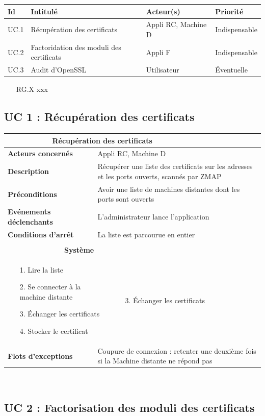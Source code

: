 \documentclass[a4paper,11pt,french]{article}
\newcommand{\fiche}[9] {
	\noindent
\begin{tabular}{|p{4cm}| p{2cm} | p{4cm} | p{.5cm} | p{7cm}|} 
\hline
\rowcolor{blue}
\multicolumn{2}{|l|}{\color{white}\bfseries{Nom}} & \multicolumn{3}{l|}{\color{white}\bfseries{#1}}\\
\hline
\multicolumn{2}{|l|}{\bfseries{Acteurs concernés}} & \multicolumn{3}{m{10.5cm}|}{#2}\\
\hline
\multicolumn{2}{|l|}{\bfseries{Description}} & \multicolumn{3}{m{10.5cm}|}{#3}\\
\hline
\multicolumn{2}{|l|}{\bfseries{Préconditions}} & \multicolumn{3}{m{10.5cm}|}{#4}\\
\hline
\multicolumn{2}{|l|}{\bfseries{Evénements déclenchants}} & \multicolumn{3}{m{10.5cm}|}{#5}\\
\hline
\multicolumn{2}{|l|}{\bfseries{Conditions d'arrêt}} & \multicolumn{3}{m{10.5cm}|}{#6}\\
\hline
\rowcolor{gray}
\multicolumn{5}{|c|}{\bfseries{Description du flot d'événements principal}}\\
\hline
\rowcolor{gray}
\multicolumn{3}{|c|}{\bfseries{Acteur(s)}} & \multicolumn{2}{c|}{\bfseries{Système}}\\
\hline
\multicolumn{3}{|p{7.5cm}|}{#7} & \multicolumn{2}{p{7.5cm}|}{#8}\\
\hline
\multicolumn{2}{|l}{\bfseries{Flots d'exceptions}} & \multicolumn{3}{|p{11.5cm}|}{#9}\\
\hline
\end{tabular}
\\
}
\begin{document}
\begin{center}
\begin{tabular}{|l|p{6cm}|p{6cm}|l|}
\hline
\bfseries{Id} & \bfseries{Intitulé} & \bfseries{Acteur(s)} & \bfseries{Priorité}\\
\hline
UC.1 & Récupération des certificats & Appli RC, Machine D & Indispensable\\
\hline
UC.2 & Factoridation des moduli des certificats & Appli F & Indispensable\\
\hline
UC.3 & Audit d'OpenSSL & Utilisateur & Éventuelle\\
\hline
\end{tabular}
\end{center}


\begin{itemize}
\item [RG.X] xxx
\end{itemize}
\subsection{UC 1 : Récupération des certificats}

\fiche
	{Récupération des certificats} %
	{Appli RC, Machine D} %
	{Récupérer une liste des certificats sur les adresses et les ports ouverts, scannés par ZMAP} %
	{Avoir une liste de machines distantes dont les ports sont ouverts} %
	{L'administrateur lance l'application} %
	{La liste est parcourue en entier} %
	{\begin{itemize}  %
		\item [1.] Lire la liste
		\item [2.] Se connecter à la machine distante
		\item [3.] Échanger les certificats
		\item [4.] Stocker le certificat
	 \end{itemize}
	} 
	{\begin{itemize}  %
		\item []
		\item []
		\item [3.] Échanger les certificats
	\end{itemize}
	 }
	{Coupure de connexion : retenter une deuxième fois si la Machine distante ne répond pas} %


\subsection{UC 2 : Factorisation des moduli des certificats}
\end{document}
